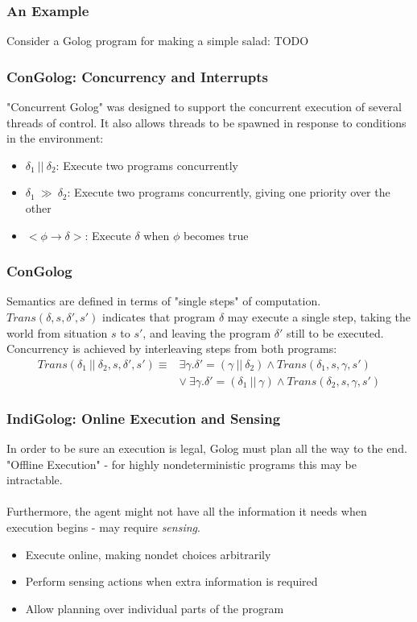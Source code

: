\documentclass{beamer}
\begin{document}
\begin{frame}
\frametitle{An Example}
Consider a Golog program for making a simple salad:
TODO
\end{frame}

\begin{frame}
\frametitle{ConGolog: Concurrency and Interrupts}
"Concurrent Golog" was designed to support the concurrent execution of
several threads of control.  It also allows threads to be spawned in
response to conditions in the environment:
\begin{itemize}
  \pause
  \item $\delta_1\ ||\ \delta_2$: Execute two programs concurrently
  \pause
  \item $\delta_1\ \gg\ \delta_2$: Execute two programs concurrently, giving one priority over the other
  \pause
  \item $<\phi \rightarrow \delta>$: Execute $\delta$ when $\phi$ becomes true
\end{itemize}
\end{frame}

\begin{frame}
\frametitle{ConGolog}
Semantics are defined in terms of "single steps" of computation.
$Trans(\delta,s,\delta',s')$ indicates that program $\delta$ may execute
a single step, taking the world from situation $s$ to $s'$, and leaving the
program $\delta'$ still to be executed.
\pause
Concurrency is achieved by interleaving steps from both programs:
\[
\begin{array}{cc}
Trans(\delta_1\ ||\ \delta_2,s,\delta',s') \equiv & \exists \gamma . \delta'=(\gamma\ ||\ \delta_2)\wedge Trans(\delta_1,s,\gamma,s')\\
& \vee\ \exists \gamma . \delta'=(\delta_1\ ||\ \gamma)\wedge Trans(\delta_2,s,\gamma,s')
\end{array}\]
\end{frame}


\begin{frame}
\frametitle{IndiGolog: Online Execution and Sensing}
In order to be sure an execution is legal, Golog must plan all the way
to the end.  "Offline Execution" - for highly nondeterministic programs
this may be intractable.\\
\ \\
Furthermore, the agent might not have all the information it needs when
execution begins - may require \emph{sensing}.

\begin{itemize}
  \pause
  \item Execute online, making nondet choices arbitrarily
  \pause
  \item Perform sensing actions when extra information is required
  \pause
  \item Allow planning over individual parts of the program
\end{itemize}
\end{frame}
\end{document}
